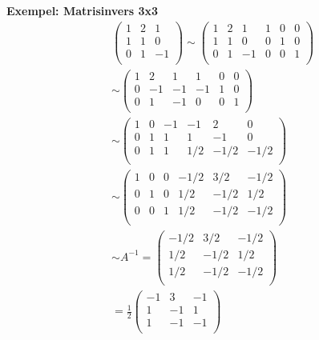 \begin{multicols}{2}
\textbf{Exempel: Matrisinvers 3x3}
\begin{align*}
  &\left(\begin{array}{ccc}
    1 & 2 & 1 \\
    1 & 1 & 0 \\
    0 & 1 & -1 \\
  \end{array}\right) \sim{}
  \left(\begin{array}{ccc|ccc}
    1 & 2 & 1   & 1 & 0 & 0 \\
    1 & 1 & 0   & 0 & 1 & 0 \\
    0 & 1 & -1  & 0 & 0 & 1 \\
  \end{array}\right) \\
  &\sim{}
  \left(\begin{array}{ccc|ccc}
    1 & 2  & 1  & 1  & 0 & 0 \\
    0 & -1 & -1 & -1 & 1 & 0 \\
    0 & 1  & -1 & 0  & 0 & 1 \\
  \end{array}\right) \\
  &\sim{}
  \left(\begin{array}{ccc|ccc}
    1 & 0  & -1 & -1  & 2    & 0   \\
    0 & 1  & 1  & 1   & -1   & 0   \\
    0 & 1  & 1  & 1/2 & -1/2 & -1/2 \\
  \end{array}\right) \\
  &\sim{}
  \left(\begin{array}{ccc|ccc}
    1 & 0  & 0  & -1/2  & 3/2  & -1/2   \\
    0 & 1  & 0  & 1/2   & -1/2 & 1/2 \\
    0 & 0  & 1  & 1/2   & -1/2 & -1/2 \\
  \end{array}\right) \\
  &\sim{} A^{-1}=
  \left(\begin{array}{ccc}
    -1/2  & 3/2  & -1/2   \\
    1/2   & -1/2 & 1/2 \\
    1/2   & -1/2 & -1/2 \\
  \end{array}\right) \\
  &= \frac{1}{2}
  \left(\begin{array}{ccc}
    -1  & 3  & -1  \\
    1   & -1 & 1   \\
    1   & -1 & -1  \\
  \end{array}\right)
\end{align*}


\end{multicols}
